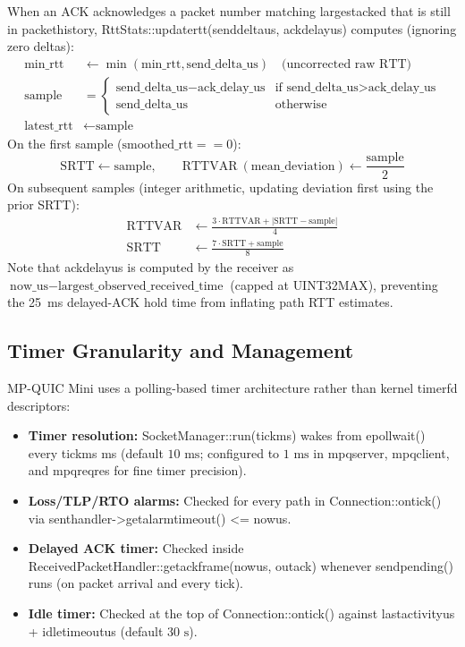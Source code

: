\documentclass[10pt,a4paper]{article}
\newcommand{\codeul}{\textunderscore\hspace{0pt}}
\DeclareRobustCommand{\code}[1]{{\ttfamily\let\_\codeul #1}}
\begin{document}
When an ACK acknowledges a packet number matching \code{largest\_acked} that is still in \code{packet\_history}, \code{RttStats::update\_rtt(send\_delta\_us, ack\_delay\_us)} computes (ignoring zero deltas):
\begin{align}
    \text{min\_rtt} &\leftarrow \min(\text{min\_rtt}, \text{send\_delta\_us}) \quad \text{(uncorrected raw RTT)} \\
    \text{sample} &=
    \begin{cases}
        \text{send\_delta\_us} - \text{ack\_delay\_us} & \text{if } \text{send\_delta\_us} > \text{ack\_delay\_us} \\
        \text{send\_delta\_us} & \text{otherwise}
    \end{cases} \\
    \text{latest\_rtt} &\leftarrow \text{sample}
\end{align}
On the first sample ($\text{smoothed\_rtt} == 0$):
\begin{equation}
    \text{SRTT} \leftarrow \text{sample}, \qquad \text{RTTVAR} \ (\text{mean\_deviation}) \leftarrow \frac{\text{sample}}{2}
\end{equation}
On subsequent samples (integer arithmetic, updating deviation first using the prior SRTT):
\begin{align}
    \text{RTTVAR} &\leftarrow \frac{3 \cdot \text{RTTVAR} + |\text{SRTT} - \text{sample}|}{4} \\
    \text{SRTT} &\leftarrow \frac{7 \cdot \text{SRTT} + \text{sample}}{8}
\end{align}
Note that \code{ack\_delay\_us} is computed by the receiver as $\text{now\_us} - \text{largest\_observed\_received\_time}$ (capped at \code{UINT32\_MAX}), preventing the 25~ms delayed-ACK hold time from inflating path RTT estimates.

\subsection{Timer Granularity and Management}
MP-QUIC Mini uses a polling-based timer architecture rather than kernel \code{timerfd} descriptors:
\begin{itemize}
    \item \textbf{Timer resolution:} \code{SocketManager::run(tick\_ms)} wakes from \code{epoll\_wait()} every \code{tick\_ms} ms (default $10\text{ ms}$; configured to $1\text{ ms}$ in \code{mpq\_server}, \code{mpq\_client}, and \code{mpq\_reqres} for fine timer precision).
    \item \textbf{Loss/TLP/RTO alarms:} Checked for every path in \code{Connection::on\_tick()} via \code{sent\_handler->get\_alarm\_timeout() <= now\_us}.
    \item \textbf{Delayed ACK timer:} Checked inside \code{ReceivedPacketHandler::get\_ack\_frame(now\_us, out\_ack)} whenever \code{send\_pending()} runs (on packet arrival and every tick).
    \item \textbf{Idle timer:} Checked at the top of \code{Connection::on\_tick()} against \code{last\_activity\_us + idle\_timeout\_us} (default $30\text{ s}$).
\end{itemize}
\end{document}
